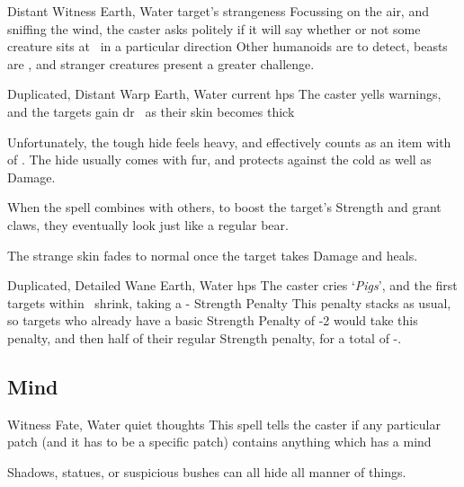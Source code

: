 \begin{multicols}{2}
{  

    {Distant}%
    {Witness}%
    {Earth, Water}%
    {target's strangeness}%
    {Focussing on the air, and sniffing the wind, the caster asks politely if it will say whether or not some creature sits at \spellRange\ in a particular direction}%
    {Other humanoids are \tn[7] to detect, beasts are \tn[9], and stranger creatures present a greater challenge.}


    {Duplicated, Distant}%
    {Warp}%
    {Earth, Water}%
    {current \glspl{hp}}%
    {The caster yells warnings, and the targets gain \gls{dr}~ as their skin becomes thick}%
    {Unfortunately, the tough hide feels heavy, and effectively counts as an item with  of .
    The hide usually comes with fur, and protects against the cold as well as Damage.

    When the spell combines with others, to boost the target's Strength and grant claws, they eventually look just like a regular bear.

    The strange skin fades to normal once the target takes Damage and heals.}

    {Duplicated, Detailed}%
    {Wane}%
    {Earth, Water}%
    {\glspl{hp}}%
    {The caster cries `\textit{Pigs}', and the first  targets within \spellRange\ shrink, taking a - Strength Penalty}%
    {
    This penalty stacks as usual, so targets who already have a basic Strength Penalty of -2 would take this penalty, and then half of their regular Strength penalty, for a total of -.}

}

\subsection{Mind}



  {}%
  {Witness}%
  {Fate, Water}%
  {quiet thoughts}%
  {This spell tells the caster if any particular patch (and it has to be a specific patch) contains anything which has a mind}%
  {Shadows, statues, or suspicious bushes can all hide all manner of things.

}
\end{multicols}
